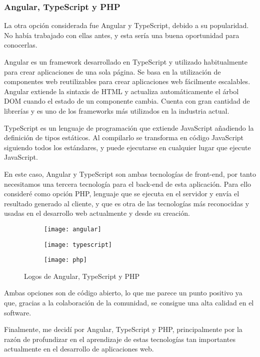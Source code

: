 \subsubsection{Angular, TypeScript y PHP}
La otra opción considerada fue Angular y TypeScript, debido a su popularidad. No había trabajado con ellas antes, y esta sería una buena oportunidad para conocerlas.
\par Angular es un framework desarrollado en TypeScript y utilizado habitualmente para crear aplicaciones de una sola página. Se basa en la utilización de componentes web reutilizables para crear aplicaciones web fácilmente escalables. Angular extiende la sintaxis de HTML y actualiza automáticamente el árbol DOM cuando el estado de un componente cambia. Cuenta con gran cantidad de librerías y es uno de los frameworks más utilizados en la industria actual\cite{Angular}.
\par TypeScript es un lenguaje de programación que extiende JavaScript añadiendo la definición de tipos estáticos. Al compilarlo se transforma en código JavaScript siguiendo todos los estándares, y puede ejecutarse en cualquier lugar que ejecute JavaScript\cite{TypeScript}.
\par En este caso, Angular y TypeScript son ambas tecnologías de front-end, por tanto necesitamos una tercera tecnología para el back-end de esta aplicación. Para ello consideré como opción PHP, lenguaje que se ejecuta en el servidor y envía el resultado generado al cliente, y que es otra de las tecnologías más reconocidas y usadas en el desarrollo web actualmente y desde su creación.
\begin{figure}[H]
	\centering
	\begin{subfigure}{0.2\textwidth}
	\centering
	\texttt{[image: angular]}
	\end{subfigure}
	\begin{subfigure}{0.3\textwidth}
	\centering
	\texttt{[image: typescript]}
	\end{subfigure}
	\begin{subfigure}{0.3\textwidth}
	\centering
	\texttt{[image: php]}
	\end{subfigure}
	\caption {Logos de Angular, TypeScript y PHP}
\end{figure}
\noindent Ambas opciones son de código abierto, lo que me parece un punto positivo ya que, gracias a la colaboración de la comunidad, se consigue una alta calidad en el software. 
\par Finalmente, me decidí por Angular, TypeScript y PHP, principalmente por la razón de profundizar en el aprendizaje de estas tecnologías tan importantes actualmente en el desarrollo de aplicaciones web.


